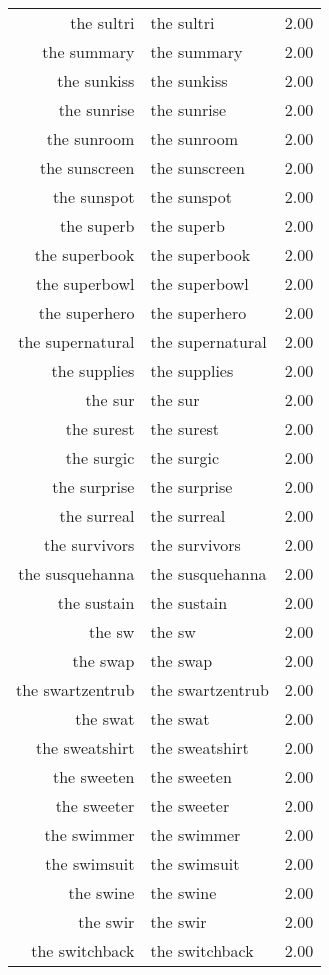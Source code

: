 \begin{table}[ht]
\begin{tabular}{rlr}
  the sultri & the sultri & 2.00 \\ 
  the summary & the summary & 2.00 \\ 
  the sunkiss & the sunkiss & 2.00 \\ 
  the sunrise & the sunrise & 2.00 \\ 
  the sunroom & the sunroom & 2.00 \\ 
  the sunscreen & the sunscreen & 2.00 \\ 
  the sunspot & the sunspot & 2.00 \\ 
  the superb & the superb & 2.00 \\ 
  the superbook & the superbook & 2.00 \\ 
  the superbowl & the superbowl & 2.00 \\ 
  the superhero & the superhero & 2.00 \\ 
  the supernatural & the supernatural & 2.00 \\ 
  the supplies & the supplies & 2.00 \\ 
  the sur & the sur & 2.00 \\ 
  the surest & the surest & 2.00 \\ 
  the surgic & the surgic & 2.00 \\ 
  the surprise & the surprise & 2.00 \\ 
  the surreal & the surreal & 2.00 \\ 
  the survivors & the survivors & 2.00 \\ 
  the susquehanna & the susquehanna & 2.00 \\ 
  the sustain & the sustain & 2.00 \\ 
  the sw & the sw & 2.00 \\ 
  the swap & the swap & 2.00 \\ 
  the swartzentrub & the swartzentrub & 2.00 \\ 
  the swat & the swat & 2.00 \\ 
  the sweatshirt & the sweatshirt & 2.00 \\ 
  the sweeten & the sweeten & 2.00 \\ 
  the sweeter & the sweeter & 2.00 \\ 
  the swimmer & the swimmer & 2.00 \\ 
  the swimsuit & the swimsuit & 2.00 \\ 
  the swine & the swine & 2.00 \\ 
  the swir & the swir & 2.00 \\ 
  the switchback & the switchback & 2.00 \\ 

\end{tabular}
\end{table}
